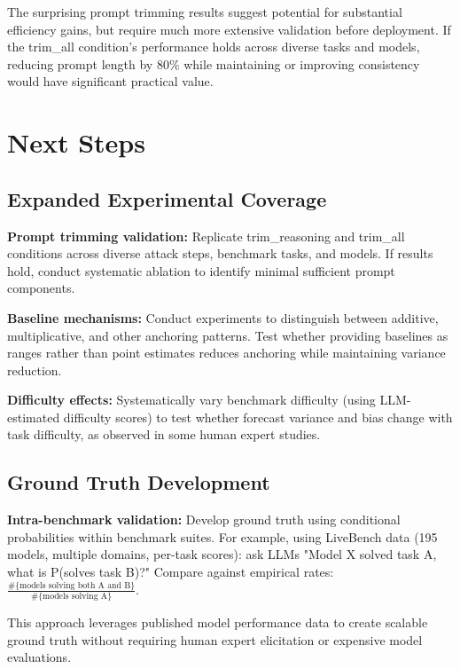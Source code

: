 \documentclass[midterm]{sparreport}
\begin{document}
The surprising prompt trimming results suggest potential for substantial efficiency gains, but require much more extensive validation before deployment. If the trim\_all condition's performance holds across diverse tasks and models, reducing prompt length by 80\% while maintaining or improving consistency would have significant practical value.

\section{Next Steps}

\subsection{Expanded Experimental Coverage}

\textbf{Prompt trimming validation:} Replicate trim\_reasoning and trim\_all conditions across diverse attack steps, benchmark tasks, and models. If results hold, conduct systematic ablation to identify minimal sufficient prompt components.

\textbf{Baseline mechanisms:} Conduct experiments to distinguish between additive, multiplicative, and other anchoring patterns. Test whether providing baselines as ranges rather than point estimates reduces anchoring while maintaining variance reduction.

\textbf{Difficulty effects:} Systematically vary benchmark difficulty (using LLM-estimated difficulty scores) to test whether forecast variance and bias change with task difficulty, as observed in some human expert studies.

\subsection{Ground Truth Development}

\textbf{Intra-benchmark validation:} Develop ground truth using conditional probabilities within benchmark suites. For example, using LiveBench data (195 models, multiple domains, per-task scores): ask LLMs "Model X solved task A, what is P(solves task B)?" Compare against empirical rates: $\frac{\#\{\text{models solving both A and B}\}}{\#\{\text{models solving A}\}}$.

This approach leverages published model performance data to create scalable ground truth without requiring human expert elicitation or expensive model evaluations.
\end{document}
